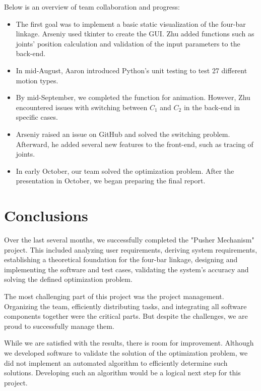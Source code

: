 \documentclass{article}
\begin{document}
Below is an overview of team collaboration and progress:
\begin{itemize}
    \item The first goal was to implement a basic static visualization of the four-bar linkage. Arseniy used tkinter to create the GUI. Zhu added functions such as joints' position calculation and validation of the input parameters to the back-end.
    \item In mid-August, Aaron introduced Python's unit testing to test 27 different motion types.
    \item By mid-September, we completed the function for animation. However, Zhu encountered issues with switching between $C_1$ and $C_2$ in the back-end in specific cases.
    \item Arseniy raised an issue on GitHub and solved the switching problem. Afterward, he added several new features to the front-end, such as tracing of joints.
    \item In early October, our team solved the optimization problem. After the presentation in October, we began preparing the final report.
\end{itemize}

\section{Conclusions}

Over the last several months, we successfully completed the "Pusher Mechanism" project. This included analyzing user requirements, deriving system requirements, establishing a theoretical foundation for the four-bar linkage, designing and implementing the software and test cases, validating the system's accuracy and solving the defined optimization problem.

The most challenging part of this project was the project management. Organizing the team, efficiently distributing tasks, and integrating all software components together were the critical parts. But despite the challenges, we are proud to successfully manage them.

While we are satisfied with the results, there is room for improvement. Although we developed software to validate the solution of the optimization problem, we did not implement an automated algorithm to efficiently determine such solutions. Developing such an algorithm would be a logical next step for this project.



\end{document}
